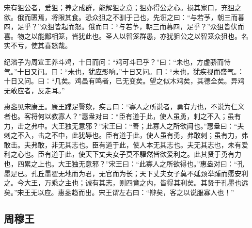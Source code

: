\documentclass[]{article}
\begin{document}
宋有狙公者，爱狙；养之成群，能解狙之意；狙亦得公之心。损其家口，充狙之欲。俄而匮焉，将限其食。恐众狙之不驯于己也，先诳之曰：``与若芧，朝三而暮四，足乎？''众狙皆起而怒。俄而曰：``与若芧，朝三而暮四，足乎？''众狙皆伏而喜。物之以能鄙相笼，皆犹此也。圣人以智笼群愚，亦犹狙公之以智笼众狙也。名实不亏，使其喜怒哉。

纪渻子为周宣王养斗鸡，十日而问：``鸡可斗已乎？''曰：``未也，方虚骄而恃气。''十日又问。曰：``未也，犹应影响。''十日又问。曰：``未也，犹疾视而盛气。：十日又问。曰：``几矣。鸡虽有鸣者，已无变矣。望之似木鸡矣，其德全矣。异鸡无敢应者，反走耳。''

惠盎见宋康王。康王蹀足謦欬，疾言曰：``寡人之所说者，勇有力也，不说为仁义者也。客将何以教寡人？''惠盎对曰：``臣有道于此，使人虽勇，刺之不入；虽有力，击之弗中。大王独无意邪？''宋王曰：``善；此寡人之所欲闻也。''惠盎曰：``夫刺之不入，击之不中，此犹辱也。臣有道于此，使人虽有勇，弗敢刺；虽有力，弗敢击。夫弗敢，非无其志也。臣有道于此，使人本无其志也。夫无其志也，未有爱利之心也。臣有道于此，使天下丈夫女子莫不驩然皆欲爱利之。此其贤于勇有力也，四累之上也。大王独无意邪？''宋王曰：``此寡人之所欲得也。''惠盎对曰：``孔墨是已。孔丘墨翟无地而为君，无官而为长；天下丈夫女子莫不延颈举踵而愿安利之。今大王，万乘之主也；诚有其志，则四竟之内，皆得其利矣。其贤于孔墨也远矣。''宋王无以应。惠盎趋而出。宋王谓左右曰：``辩矣，客之以说服寡人也！''

\hypertarget{header-n47}{%
\subsection{周穆王}\label{header-n47}}
\end{document}
